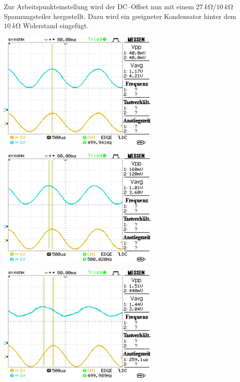 \documentclass[10pt]{article}
\newenvironment{Figure}
  {\par\medskip\noindent\minipage{\linewidth}}
  {\endminipage\par\medskip}
\begin{document}
\begin{multicols}{2}
\begin{Figure}
        \end{Figure}
        Zur Arbeitspunkteinstellung wird der DC--Offset nun mit einem $\SI{27}{k\ohm}/\SI{10}{k\ohm}$ Spannungsteiler hergestellt. Dazu wird ein geeigneter Kondensator hinter dem $\SI{10}{k\ohm}$ Widerstand eingefügt.
        \begin{Figure}
                \centering
                \includegraphics[width=0.6\textwidth]{data/DS0006.png}
        \end{Figure}
        \begin{Figure}
                \centering
                \includegraphics[width=0.6\textwidth]{data/DS0007.png}
        \end{Figure}
        \begin{Figure}
                \centering
                \includegraphics[width=0.6\textwidth]{data/DS0008.png}

\end{Figure}
\end{multicols}
\end{document}
